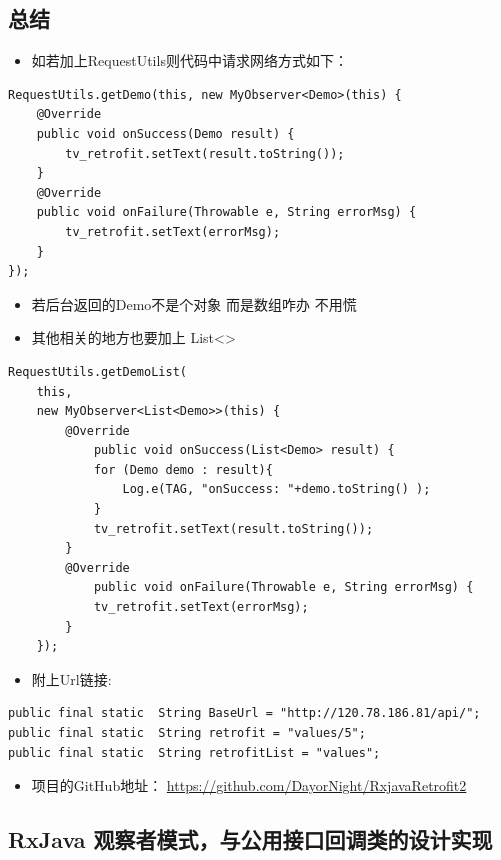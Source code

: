 \documentclass[9pt, b5paper]{article}
\begin{document}
\subsection{总结}
\label{sec-18-5}
\begin{itemize}
\item 如若加上RequestUtils则代码中请求网络方式如下：
\end{itemize}
\begin{verbatim}
RequestUtils.getDemo(this, new MyObserver<Demo>(this) {
    @Override
    public void onSuccess(Demo result) {
        tv_retrofit.setText(result.toString());
    }
    @Override
    public void onFailure(Throwable e, String errorMsg) {
        tv_retrofit.setText(errorMsg);
    }
});
\end{verbatim}
\begin{itemize}
\item 若后台返回的Demo不是个对象 而是数组咋办 不用慌
\item 其他相关的地方也要加上 List<>
\end{itemize}
\begin{verbatim}
RequestUtils.getDemoList(
    this,
    new MyObserver<List<Demo>>(this) {
        @Override
            public void onSuccess(List<Demo> result) {
            for (Demo demo : result){
                Log.e(TAG, "onSuccess: "+demo.toString() );
            }
            tv_retrofit.setText(result.toString());
        }
        @Override
            public void onFailure(Throwable e, String errorMsg) {
            tv_retrofit.setText(errorMsg);
        }
    });
\end{verbatim}
\begin{itemize}
\item 附上Url链接:
\end{itemize}
\begin{verbatim}
public final static  String BaseUrl = "http://120.78.186.81/api/";
public final static  String retrofit = "values/5";
public final static  String retrofitList = "values";
\end{verbatim}
\begin{itemize}
\item 项目的GitHub地址： \url{https://github.com/DayorNight/RxjavaRetrofit2}
\end{itemize}

\subsection{RxJava 观察者模式，与公用接口回调类的设计实现}
\label{sec-18-6}
\end{document}
